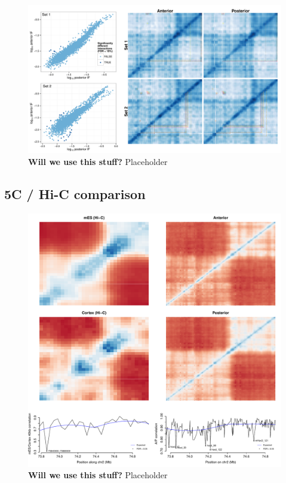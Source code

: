 \documentclass[a4paper,10pt,oneside]{book}
\begin{document}

\begin{figure}
\begin{center} 
\includegraphics[width=\textwidth]{figs/5cdiff.pdf}
\captionsetup{width=\textwidth} 
\caption{ {\bf Will we use this stuff? }
Placeholder
}\label{fig:5cdiff}
\end{center} 
\end{figure} 


\subsection{5C / Hi-C comparison}

\begin{figure}
\begin{center} 
\includegraphics[width=\textwidth]{figs/5chic.pdf}
\captionsetup{width=\textwidth} 
\caption{ {\bf Will we use this stuff? }
Placeholder
}\label{fig:5cdiff}
\end{center} 
\end{figure} 


\ifstandalone
\begin{small}

\end{small}
\fi
\end{document}
